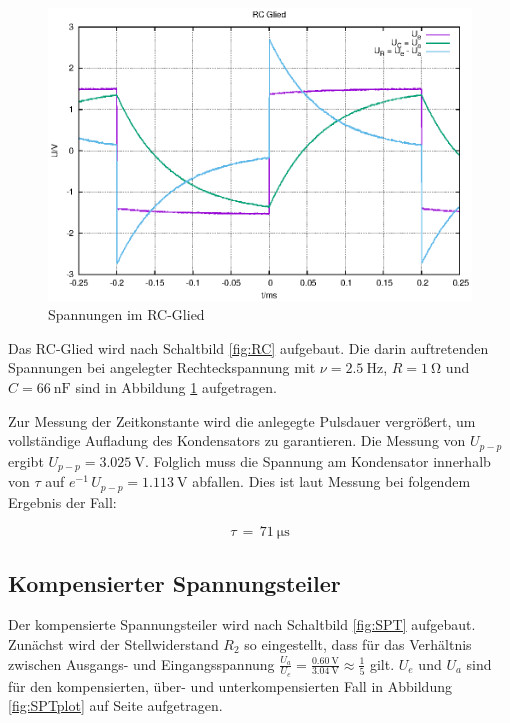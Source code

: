 \documentclass[10pt,a4paper]{scrartcl}
\begin{document}
\begin{figure}[!ht]
    \centering
    \includegraphics{graphics/CN_plot.eps}
    \caption{Spannungen im RC-Glied} \label{fig:RCplot}
\end{figure}

Das RC-Glied wird nach Schaltbild \ref{fig:RC} aufgebaut.
Die darin auftretenden Spannungen bei angelegter Rechteckspannung mit
$\nu=2.5~\mathrm{Hz}$, $R=1~\mathrm{\Omega}$ und $C=66~\mathrm{nF}$
sind in Abbildung \ref{fig:RCplot} aufgetragen.

Zur Messung der Zeitkonstante wird die anlegegte Pulsdauer vergrößert,
um vollständige Aufladung des Kondensators zu garantieren.
Die Messung von $U_{p-p}$ ergibt $U_{p-p}=3.025~\mathrm V$.
Folglich muss die Spannung am Kondensator innerhalb von $\tau$ auf
$e^{-1}\,U_{p-p}=1.113~\mathrm V$ abfallen.
Dies ist laut Messung bei folgendem Ergebnis der Fall:

\begin{equation*}
    \boxed{\tau\,=\,71~\mathrm{\mu s}}
\end{equation*}

\subsection {Kompensierter Spannungsteiler}

Der kompensierte Spannungsteiler wird nach Schaltbild \ref{fig:SPT} aufgebaut.
Zunächst wird der Stellwiderstand $R_2$ so eingestellt,
dass für das Verhältnis zwischen Ausgangs- und Eingangsspannung
$\frac{U_a}{U_e}=\frac{0.60~\mathrm{V}}{3.04~\mathrm{V}}\approx\frac{1}{5}$
gilt.
$U_e$ und $U_a$ sind für den kompensierten, über- und unterkompensierten Fall
in Abbildung \ref{fig:SPTplot} auf Seite \pageref{fig:SPTplot} aufgetragen.
\end{document}
